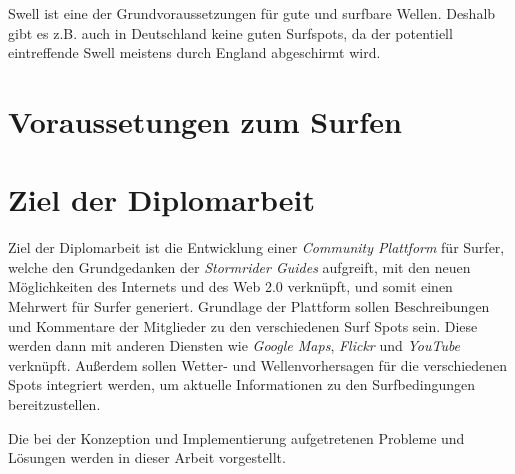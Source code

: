 Swell ist eine der Grundvoraussetzungen für gute und surfbare
Wellen. Deshalb gibt es z.B. auch in Deutschland keine guten
Surfspots, da der potentiell eintreffende Swell meistens durch England
abgeschirmt wird.

\section{Voraussetungen zum Surfen}

\section{Ziel der Diplomarbeit}

Ziel der Diplomarbeit ist die Entwicklung einer \textit{Community
  Plattform} für Surfer, welche den Grundgedanken der
\textit{Stormrider Guides} aufgreift, mit den neuen Möglichkeiten des
Internets und des Web 2.0 verknüpft, und somit einen Mehrwert für
Surfer generiert. Grundlage der Plattform sollen Beschreibungen und
Kommentare der Mitglieder zu den verschiedenen Surf Spots sein. Diese
werden dann mit anderen Diensten wie \textit{Google Maps},
\textit{Flickr} und \textit{YouTube} verknüpft. Außerdem sollen
Wetter- und Wellenvorhersagen für die verschiedenen Spots integriert
werden, um aktuelle Informationen zu den Surfbedingungen
bereitzustellen.

Die bei der Konzeption und Implementierung aufgetretenen Probleme und
Lösungen werden in dieser Arbeit vorgestellt.



% 

